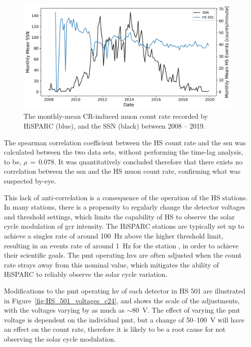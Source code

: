 \begin{figure}[ht!]
	\includegraphics[width=\columnwidth]{HS_501_vs_SSN_c24.png}
	\caption{The monthly-mean CR-induced muon count rate recorded by HiSPARC (blue), and the SSN (black) between 2008 -- 2019.}
	\label{fig:HS_SSN_timeseries}
\end{figure}

The spearman correlation coefficient between the HS count rate and the \gls{ssn} was calculated between the two data sets, without performing the time-lag analysis, to be, $\rho\,=\,0.078$. It was quantitatively concluded therefore that there exists no correlation between the \gls{ssn} and the HS muon count rate, confirming what was suspected by-eye.

This lack of anti-correlation is a consequence of the operation of the HS stations. In many stations, there is a propensity to regularly change the detector voltages and threshold settings, which limits the capability of HS to observe the solar cycle modulation of \gls{gcr} intensity. The HiSPARC stations are typically set up to achieve a singles rate of around 100~Hz above the higher threshold limit, resulting in an events rate of around 1~Hz for the station \citep{fokkema_hisparc_2012}, in order to achieve their scientific goals. The \gls{pmt} operating \glspl{hv} are often adjusted when the count rate strays away from this nominal value, which mitigates the ability of HiSPARC to reliably observe the solar cycle variation. 

Modifications to the \gls{pmt} operating \gls{hv} of each detector in HS 501 are illustrated in Figure~\ref{fig:HS_501_voltages_c24}, and shows the scale of the adjustments, with the voltages varying by as much as $\sim 80$~V. The effect of varying the \gls{pmt} voltage is dependent on the individual \gls{pmt}, but a change of 50--100~V will have an effect on the count rate, therefore it is likely to be a root cause for not observing the solar cycle modulation.

